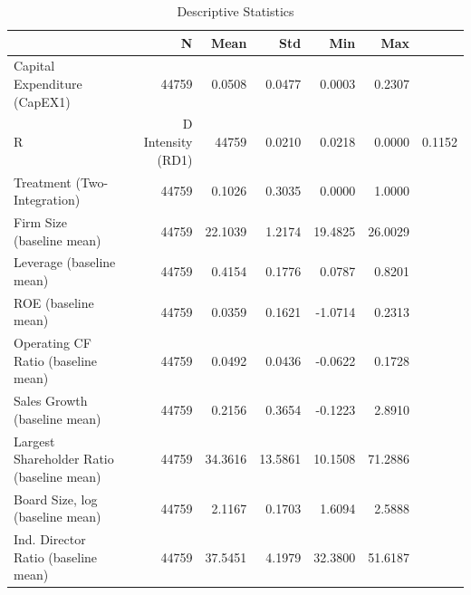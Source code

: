 \begin{table}
\caption{Descriptive Statistics}
\label{tab:descriptive}
\begin{tabular}{lrrrrr}
\toprule
 & N & Mean & Std & Min & Max \\
\midrule
Capital Expenditure (CapEX1) & 44759 & 0.0508 & 0.0477 & 0.0003 & 0.2307 \\
R&D Intensity (RD1) & 44759 & 0.0210 & 0.0218 & 0.0000 & 0.1152 \\
Treatment (Two-Integration) & 44759 & 0.1026 & 0.3035 & 0.0000 & 1.0000 \\
Firm Size (baseline mean) & 44759 & 22.1039 & 1.2174 & 19.4825 & 26.0029 \\
Leverage (baseline mean) & 44759 & 0.4154 & 0.1776 & 0.0787 & 0.8201 \\
ROE (baseline mean) & 44759 & 0.0359 & 0.1621 & -1.0714 & 0.2313 \\
Operating CF Ratio (baseline mean) & 44759 & 0.0492 & 0.0436 & -0.0622 & 0.1728 \\
Sales Growth (baseline mean) & 44759 & 0.2156 & 0.3654 & -0.1223 & 2.8910 \\
Largest Shareholder Ratio (baseline mean) & 44759 & 34.3616 & 13.5861 & 10.1508 & 71.2886 \\
Board Size, log (baseline mean) & 44759 & 2.1167 & 0.1703 & 1.6094 & 2.5888 \\
Ind. Director Ratio (baseline mean) & 44759 & 37.5451 & 4.1979 & 32.3800 & 51.6187 \\
\bottomrule
\end{tabular}
\end{table}
